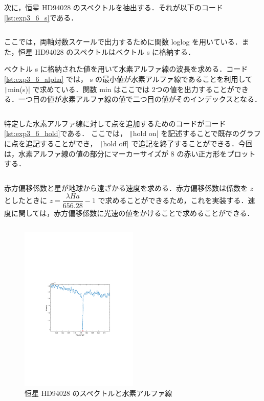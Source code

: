 \documentclass[dvipdfmx, titlepage, t]{jsarticle}
\begin{document}
    次に，恒星 HD94028 のスペクトルを抽出する．それが以下のコード \ref{lst:exp3_6_s}である．
    \inputminted[linenos, firstline=14, lastline=19, frame=lines, fontsize=\small]{matlab}{code/Exp3_6_Matlab.m}
    ここでは，両軸対数スケールで出力するために関数 loglog を用いている．また，恒星 HD94028 のスペクトルはベクトル s に格納する．

    ベクトル s に格納された値を用いて水素アルファ線の波長を求める．コード \ref{lst:exp3_6_alpha} では， s の最小値が水素アルファ線であることを利用して \texttt|min(s)| で求めている．関数 min はここでは 2つの値を出力することができる．一つ目の値が水素アルファ線の値で二つ目の値がそのインデックスとなる．

    \inputminted[linenos, firstline=20, lastline=23, frame=lines, fontsize=\small]{matlab}{code/Exp3_6_Matlab.m}

    特定した水素アルファ線に対して点を追加するためのコードがコード\ref{lst:exp3_6_hold}である． ここでは， \texttt|hold on| を記述することで既存のグラフに点を追記することができ， \texttt|hold off| で追記を終了することができる．今回は，水素アルファ線の値の部分にマーカーサイズが 8 の赤い正方形をプロットする．
    \inputminted[linenos, firstline=24, lastline=27, frame=lines, fontsize=\small]{matlab}{code/Exp3_6_Matlab.m}
    
    赤方偏移係数と星が地球から遠ざかる速度を求める．赤方偏移係数は係数を $z$ としたときに $z = \dfrac{\lambda Ha }{656.28} - 1$ で求めることができるため，これを実装する．速度に関しては，赤方偏移係数に光速の値をかけることで求めることができる．
    \inputminted[linenos, firstline=29, lastline=31, frame=lines, fontsize=\small]{matlab}{code/Exp3_6_Matlab.m}

    \begin{figure}[H]
        \centering
        \includegraphics[width=0.5\textwidth]{figure/stellar1.pdf}
        \caption{恒星 HD94028 のスペクトルと水素アルファ線}
        \label{fig:exp3_6_spectra}
    \end{figure}
\end{document}
